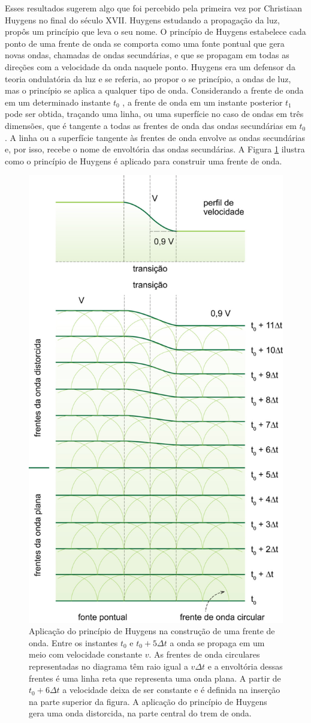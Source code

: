\documentclass[]{book}
\theoremstyle{definition}
\theoremstyle{definition}
\theoremstyle{definition}
\theoremstyle{remark}
\begin{document}
Esses resultados sugerem algo que foi percebido pela primeira vez por Christiaan Huygens no final do século XVII. Huygens estudando a propagação da luz, propôs um princípio que leva o seu nome. O princípio de Huygens estabelece cada ponto de uma frente de onda se comporta como uma fonte pontual que gera novas ondas, chamadas de ondas secundárias, e que se propagam em todas as direções com a velocidade da onda naquele ponto. Huygens era um defensor da teoria ondulatória da luz e se referia, ao propor o se princípio, a ondas de luz, mas o princípio se aplica a qualquer tipo de onda. Considerando a frente de onda em um determinado instante \(t_0\) , a frente de onda em um instante posterior \(t_1\) pode ser obtida, traçando uma linha, ou uma superfície no caso de ondas em três dimensões, que é tangente a todas as frentes de onda das ondas secundárias em \(t_0\). A linha ou a superfície tangente às frentes de onda envolve as ondas secundárias e, por isso, recebe o nome de envoltória das ondas secundárias. A Figura \ref{fig:usp0402} ilustra como o princípio de Huygens é aplicado para construir uma frente de onda.

\begin{figure}

{\centering \includegraphics[width=0.6\linewidth]{fig/figU02} 

}

\caption{Aplicação do princípio de Huygens na construção de uma frente de onda. Entre os instantes $t_0$ e $t_0 + 5\Delta t$ a onda se propaga em um meio com velocidade constante $v$. As frentes de onda circulares representadas no diagrama têm raio igual a $v\Delta t$ e a envoltória dessas frentes é uma linha reta que representa uma onda plana. A partir de $t_0 + 6\Delta t$ a velocidade deixa de ser constante e é definida na inserção na parte superior da figura. A aplicação do princípio de Huygens gera uma onda distorcida, na parte central do trem de onda.}\label{fig:usp0402}
\end{figure}
\end{document}
